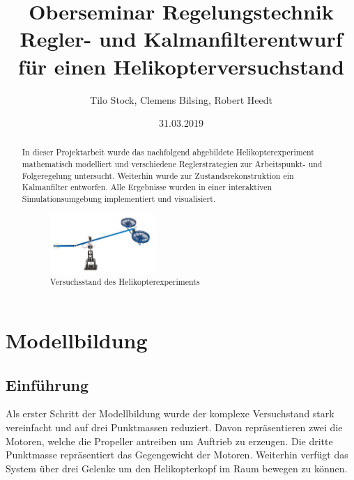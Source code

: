 \documentclass[10pt,twocolumn]{article}
\begin{document}
	\title{Oberseminar Regelungstechnik \\ Regler- und Kalmanfilterentwurf f\"ur einen 					Helikopterversuchstand}
	\author{Tilo Stock, Clemens Bilsing, Robert Heedt}
	\date {31.03.2019}

	\maketitle
	\thispagestyle{empty}
	
	\renewcommand\abstractname{Zusammenfassung}
	\begin{abstract}
		In dieser Projektarbeit wurde das nachfolgend abgebildete Helikopterexperiment mathematisch modelliert und verschiedene Reglerstrategien zur Arbeitspunkt- und Folgeregelung untersucht.
		Weiterhin wurde zur Zustandsrekonstruktion ein Kalmanfilter entworfen. Alle Ergebnisse wurden in einer interaktiven Simulationsumgebung implementiert und visualisiert.

		\begin{figure}[ht]
			\centering
			\includegraphics[width=0.4\textwidth]{images/Versuchstand}
			\caption{Versuchsstand des Helikopterexperiments}
			\label{Versuchstand}
		\end{figure}
	\end{abstract}
	
	\section{Modellbildung}
	\subsection{Einführung}

	Als erster Schritt der Modellbildung wurde der komplexe Versuchstand stark vereinfacht und auf drei Punktmassen reduziert. Davon repräsentieren zwei die Motoren, welche die Propeller antreiben um Auftrieb zu erzeugen. Die dritte Punktmasse repräsentiert das Gegengewicht der Motoren. Weiterhin verfügt das System über drei Gelenke um den Helikopterkopf im Raum bewegen zu können.
\end{document}
